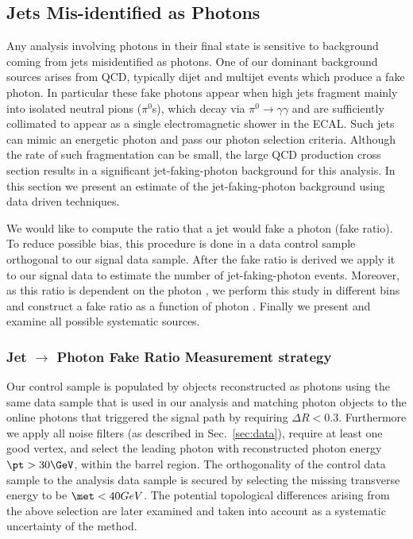 \subsection{Jets Mis-identified as Photons}
\label{sec:fakerate}
Any analysis involving photons in their final state is sensitive to background coming from jets misidentified as photons.
One of our dominant background sources arises from QCD, typically dijet and multijet events which produce a fake photon.
In particular these fake photons appear when high \met jets fragment mainly into isolated neutral pions (${\pi}^0$s),
which decay via ${\pi}^0 \rightarrow \gamma \gamma$ and are sufficiently collimated to appear as a single electromagnetic shower in the ECAL.
Such jets can mimic an energetic photon and pass our photon selection criteria.
Although the rate of such fragmentation can be small, the large QCD production cross section results in a significant jet-faking-photon background for this analysis.
In this section we present an estimate of the jet-faking-photon background using data driven techniques.

We would like to compute the ratio that a jet would fake a photon (fake ratio).
To reduce possible bias, this procedure is done in a data control sample orthogonal to our signal data sample.
After the fake ratio is derived we apply it to our signal data to estimate the number of jet-faking-photon events.
Moreover, as this ratio is dependent on the photon \et, 
we perform this study in different \et bins and construct a fake ratio as a function of photon \et. Finally we present and examine all possible systematic sources.

\subsubsection{Jet $\rightarrow$ Photon Fake Ratio Measurement strategy}
Our control sample is populated by objects reconstructed as photons using the same data sample that is used in our analysis and matching photon objects to the online photons that triggered the signal path by requiring $\Delta R < 0.3$.
Furthermore we apply all noise filters (as described in Sec.~\ref{sec:data}), require at least one good vertex, and select the leading photon with reconstructed photon energy $\pt > 30 \GeV$, within the barrel region.
The orthogonality of the control data sample to the analysis data sample is secured by selecting the missing transverse energy to be $\met < 40 GeV$. The potential topological differences arising from the above selection are later examined and taken into account as a systematic uncertainty of the method.

